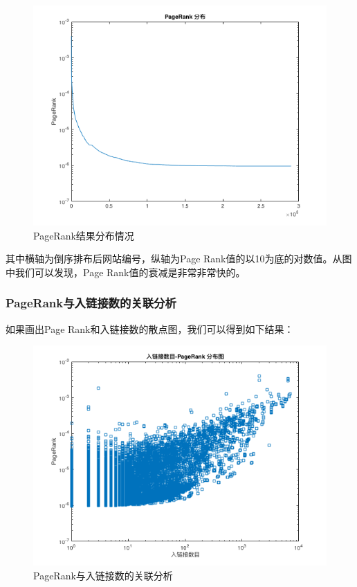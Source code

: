 \documentclass[paper=a4, fontsize=11pt, UTF8]{article} %
\numberwithin{equation}{section} %
\numberwithin{figure}{section} %
\numberwithin{table}{section} %
\begin{document}
\begin{figure}[htp]
\center
\includegraphics[scale=0.5]{pr}
\caption{PageRank结果分布情况}
\end{figure}

其中横轴为倒序排布后网站编号，纵轴为Page Rank值的以10为底的对数值。从图中我们可以发现，Page Rank值的衰减是非常非常快的。

\subsubsection{PageRank与入链接数的关联分析}

如果画出Page Rank和入链接数的散点图，我们可以得到如下结果：

\begin{figure}[htp]
\center
\includegraphics[scale=0.5]{pr_in_degree}
\caption{PageRank与入链接数的关联分析}
\end{figure}
\end{document}
